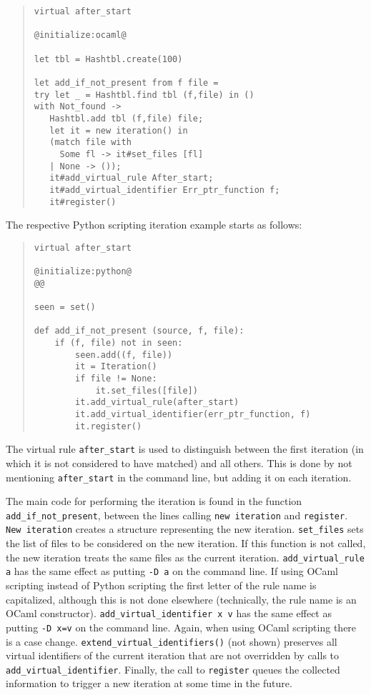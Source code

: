 \begin{quote}
\begin{verbatim}
virtual after_start

@initialize:ocaml@

let tbl = Hashtbl.create(100)

let add_if_not_present from f file =
try let _ = Hashtbl.find tbl (f,file) in ()
with Not_found ->
   Hashtbl.add tbl (f,file) file;
   let it = new iteration() in
   (match file with
     Some fl -> it#set_files [fl]
   | None -> ());
   it#add_virtual_rule After_start;
   it#add_virtual_identifier Err_ptr_function f;
   it#register()
\end{verbatim}
\end{quote}

The respective Python scripting iteration example starts as follows:

\begin{quote}
\begin{verbatim}
virtual after_start

@initialize:python@
@@

seen = set()

def add_if_not_present (source, f, file):
    if (f, file) not in seen:
        seen.add((f, file))
        it = Iteration()
        if file != None:
            it.set_files([file])
        it.add_virtual_rule(after_start)
        it.add_virtual_identifier(err_ptr_function, f)
        it.register()
\end{verbatim}
\end{quote}

The virtual rule {\tt after\_start} is used to distinguish between the
first iteration (in which it is not considered to have matched) and all
others.  This is done by not mentioning {\tt after\_start} in the command
line, but adding it on each iteration.

The main code for performing the iteration is found in the function {\tt
  add\_if\_not\_present}, between the lines calling {\tt new iteration} and
{\tt register}.  {\tt New iteration} creates a structure representing the
new iteration.  {\tt set\_files} sets the list of files to be considered on
the new iteration.  If this function is not called, the new iteration
treats the same files as the current iteration.  {\tt add\_virtual\_rule a}
has the same effect as putting {\tt -D a} on the command line.  If
using OCaml scripting instead of Python scripting the first letter of the rule
name is capitalized, although this is not done elsewhere (technically, the
rule name is an OCaml constructor).
{\tt add\_virtual\_identifier x v} has the same effect as putting {\tt -D x=v}
on the command line.  Again, when using OCaml scripting there is a case change.
{\tt extend\_virtual\_identifiers()} (not shown) preserves all virtual
identifiers of the current iteration that are not overridden by calls to
{\tt add\_virtual\_identifier}.  Finally, the call to {\tt register} queues
the collected information to trigger a new iteration at some time in the
future.

